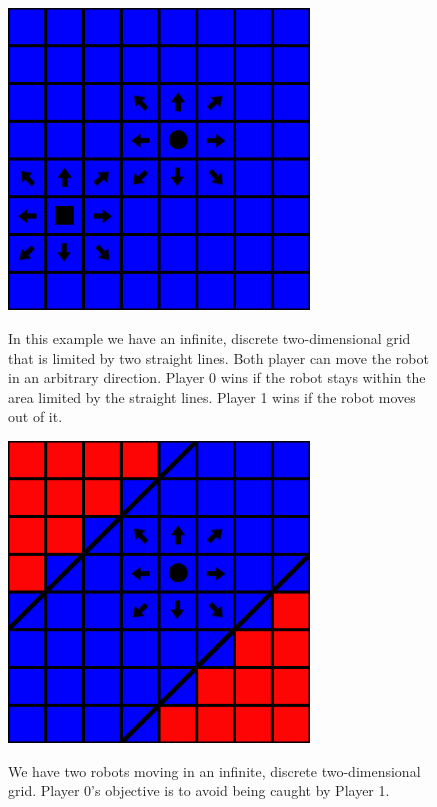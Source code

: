 \documentclass[10pt,a4paper]{article}
\theoremstyle{plain}
\theoremstyle{definition}
\begin{document}
\begin{figure}
  \caption{In this example we have an infinite, discrete two-dimensional grid that is limited by two straight lines. Both player can move the robot in an arbitrary direction. Player 0 wins if the robot stays within the area limited by the straight lines. Player 1 wins if the robot moves out of it.}
  \centering
    {\includegraphics[width=8.0cm]{catch.png}} 
\end{figure}

\begin{figure}
  \caption{We have two robots moving in an infinite, discrete two-dimensional grid. Player 0's objective is to avoid being caught by Player 1.
}
  \centering
    {\includegraphics[width=8.0cm]{zwei_geraden.png}} 
\end{figure}
\end{document}
